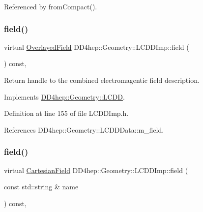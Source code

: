 Referenced by from\+Compact().

\hypertarget{class_d_d4hep_1_1_geometry_1_1_l_c_d_d_imp_aca6f9ec862a0dbf793d2d26afc34039b}{}\label{class_d_d4hep_1_1_geometry_1_1_l_c_d_d_imp_aca6f9ec862a0dbf793d2d26afc34039b} 
\subsubsection{\texorpdfstring{field()}{field()}\hspace{0.1cm}{\footnotesize\ttfamily [1/2]}}
{\footnotesize\ttfamily virtual \hyperlink{class_d_d4hep_1_1_geometry_1_1_overlayed_field}{Overlayed\+Field} D\+D4hep\+::\+Geometry\+::\+L\+C\+D\+D\+Imp\+::field (\begin{DoxyParamCaption}{ }\end{DoxyParamCaption}) const\hspace{0.3cm}{\ttfamily [inline]}, {\ttfamily [virtual]}}



Return handle to the combined electromagentic field description. 



Implements \hyperlink{class_d_d4hep_1_1_geometry_1_1_l_c_d_d_a62750fbd02e0f4e06c570d00dc9eb2ca}{D\+D4hep\+::\+Geometry\+::\+L\+C\+DD}.



Definition at line 155 of file L\+C\+D\+D\+Imp.\+h.



References D\+D4hep\+::\+Geometry\+::\+L\+C\+D\+D\+Data\+::m\+\_\+field.

\hypertarget{class_d_d4hep_1_1_geometry_1_1_l_c_d_d_imp_ad80857a2febc6efe278c56e7ad1e25b8}{}\label{class_d_d4hep_1_1_geometry_1_1_l_c_d_d_imp_ad80857a2febc6efe278c56e7ad1e25b8} 
\subsubsection{\texorpdfstring{field()}{field()}\hspace{0.1cm}{\footnotesize\ttfamily [2/2]}}
{\footnotesize\ttfamily virtual \hyperlink{class_d_d4hep_1_1_geometry_1_1_cartesian_field}{Cartesian\+Field} D\+D4hep\+::\+Geometry\+::\+L\+C\+D\+D\+Imp\+::field (\begin{DoxyParamCaption}\item[{const std\+::string \&}]{name }\end{DoxyParamCaption}) const\hspace{0.3cm}{\ttfamily [inline]}, {\ttfamily [virtual]}}



